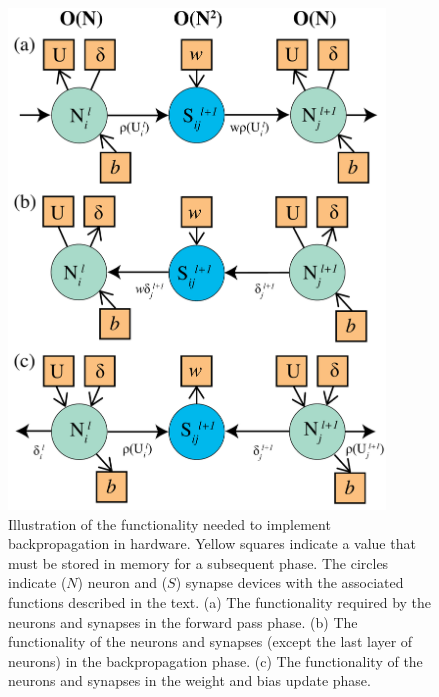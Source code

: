 \documentclass[utf8]{frontiersSCNS}
\begin{document}
\begin{figure}[h!]
\begin{center}
\includegraphics[width=10cm]{figures/back_prop_sb.pdf}
\end{center}
\caption{Illustration of the functionality needed to implement backpropagation in hardware. Yellow squares indicate a value that must be stored in memory for a subsequent phase. The circles indicate ($N$) neuron and ($S$) synapse devices with the associated functions described in the text. (a) The functionality required by the neurons and synapses in the forward pass phase. (b) The functionality of the neurons and synapses (except the last layer of neurons) in the backpropagation phase. (c) The functionality of the neurons and synapses in the weight and bias update phase.} \label{fig:back_prop}
\end{figure}
\end{document}
